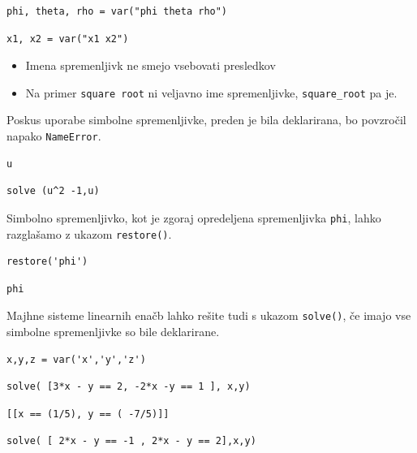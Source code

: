 \begin{verbatim}
phi, theta, rho = var("phi theta rho")
\end{verbatim}

\begin{verbatim}
x1, x2 = var("x1 x2")
\end{verbatim}

\begin{itemize}
\item Imena spremenljivk ne smejo vsebovati presledkov
\item Na primer \texttt{square root} ni veljavno ime spremenljivke, \texttt{square\_root} pa je.
\end{itemize}

Poskus uporabe simbolne spremenljivke, preden je bila deklarirana, bo povzročil napako \texttt{NameError}.

\begin{verbatim}
u
\end{verbatim}

\begin{verbatim}
solve (u^2 -1,u)
\end{verbatim}

Simbolno spremenljivko, kot je zgoraj opredeljena spremenljivka \texttt{phi}, lahko razglašamo z ukazom \texttt{restore()}.

\begin{verbatim}
restore('phi')
\end{verbatim}

\begin{verbatim}
phi
\end{verbatim}

Majhne sisteme linearnih enačb lahko rešite tudi s ukazom \texttt{solve()}, če imajo vse simbolne spremenljivke so bile deklarirane.

\begin{verbatim}
x,y,z = var('x','y','z')
\end{verbatim}

\begin{verbatim}
solve( [3*x - y == 2, -2*x -y == 1 ], x,y)
\end{verbatim}

\begin{verbatim}
[[x == (1/5), y == ( -7/5)]]
\end{verbatim}

\begin{verbatim}
solve( [ 2*x - y == -1 , 2*x - y == 2],x,y)
\end{verbatim}

